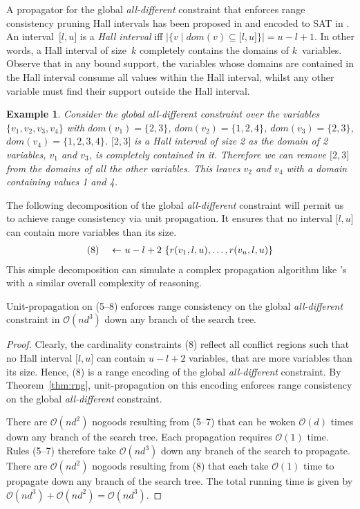 \documentclass{tlp}
\newtheorem{example}{Example}
\newcommand{\domain}[1]{dom(#1)}
\begin{document}
A propagator for the global \emph{all-different} constraint that enforces range consistency pruning Hall intervals has been proposed in  and encoded to SAT in .
An interval~$\lbrack l, u \rbrack$ is a \emph{Hall interval} iff $|\{ v \mid dom(v) \subseteq \lbrack l, u \rbrack \}| = u - l + 1$. In other words, a Hall interval of size~$k$ completely contains the domains of $k$~variables. Observe that in any bound support, the variables whose domains are contained in the Hall interval consume all values within the Hall interval, whilst any other variable must find their support outside the Hall interval.
\begin{example}
Consider the global \emph{all-different} constraint over the variables~$\{v_1, v_2, v_3, v_4\}$ with $\domain{v_1} = \{2,3\}$, $\domain{v_2} = \{1,2,4\}$, $\domain{v_3} = \{2,3\}$, $\domain{v_4} = \{1,2,3,4\}$. $\lbrack 2,3\rbrack$ is a Hall interval of size 2 as the domain of 2 variables, $v_1$ and $v_3$, is completely contained in it. Therefore we can remove $\lbrack 2,3\rbrack$ from the domains of all the other variables. This leaves $v_2$ and $v_4$ with a domain containing values 1 and 4.
\end{example}
The following decomposition of the global \emph{all-different} constraint will permit us to achieve range consistency via unit propagation. It ensures that no interval $\lbrack l, u\rbrack$ can contain more variables than its size. 
\[
\begin{array}{lr@{\ \leftarrow\ }l}
(8) & & u-l+2\ \{ r(v_1, l, u), \dots, r(v_n, l, u) \}
\end{array}
\]
This simple decomposition can simulate a complex propagation algorithm like 's with a similar overall complexity of reasoning.
\begin{corollary} \label{col:rng}
Unit-propagation on (5--8) enforces range consistency on the global \emph{all-different} constraint in $\mathcal{O}(nd^3)$ down any branch of the search tree.
\end{corollary}
\begin{proof}
Clearly, the cardinality constraints (8) reflect all conflict regions such that no Hall interval $\lbrack l, u \rbrack$ can contain $u-l+2$ variables, that are more variables than its size. Hence, (8) is a range encoding of the global \emph{all-different} constraint. By Theorem~\ref{thm:rng}, unit-propagation on this encoding enforces range consistency on the global \emph{all-different} constraint.

There are $\mathcal{O}(nd^2)$ nogoods resulting from (5--7) that can be woken $\mathcal{O}(d)$ times down any branch of the search tree. Each propagation requires $\mathcal{O}(1)$ time. Rules (5--7) therefore take $\mathcal{O}(nd^3)$ down any branch of the search to propagate. There are $\mathcal{O}(nd^2)$ nogoods resulting from (8) that each take $\mathcal{O}(1)$ time to propagate down any branch of the search tree. The total running time is given by $\mathcal{O}(nd^3) + \mathcal{O}(nd^2) = \mathcal{O}(nd^3)$.
\end{proof}
\end{document}
